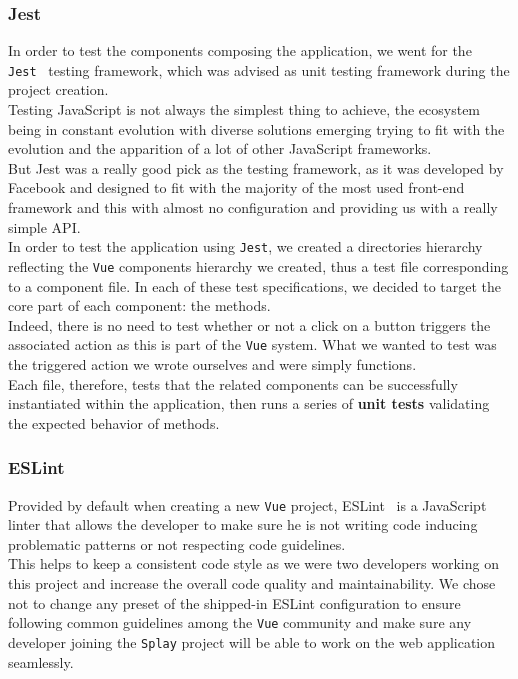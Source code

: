 \documentclass{eplmastersthesis}
\begin{document}
        \subsubsection{Jest}

          In order to test the components composing the application, we
          went for the \texttt{Jest}~\cite{jest} testing framework, which was advised
          as unit testing framework during the project creation.\\

          Testing JavaScript is not always the simplest thing to achieve, the
          ecosystem being in constant evolution with diverse solutions emerging
          trying to fit with the evolution and the apparition of a lot of
          other JavaScript frameworks.\\
          But Jest was a really good pick as the testing framework, as it was
          developed by Facebook and designed to fit with the majority of the
          most used front-end framework and this with almost no configuration and
          providing us with a really simple API.\\

          In order to test the application using \texttt{Jest}, we created a directories
          hierarchy reflecting the \texttt{Vue} components hierarchy we created, thus
          a test file corresponding to a component file. In each of these
          test specifications, we decided to target the core part of each
          component: the methods.\\
          Indeed, there is no need to test whether or not a click on a button
          triggers the associated action as this is part of the \texttt{Vue} system. What
          we wanted to test was the triggered action we wrote ourselves and
          were simply functions.\\
          Each file, therefore, tests that the related components can be
          successfully instantiated within the application, then runs a series
          of \textbf{unit tests} validating the expected behavior of methods.

        \subsubsection{ESLint}

          Provided by default when creating a new \texttt{Vue} project, ESLint~\cite{eslint}
          is a JavaScript linter that allows the developer to
          make sure he is not writing code inducing problematic patterns or not
          respecting code guidelines.\\
          This helps to keep a consistent code style as we were two developers working
          on this project and increase the overall code quality and
          maintainability. We chose not to change any preset of the shipped-in
          ESLint configuration to ensure following common guidelines among the \texttt{Vue}
          community and make sure any developer joining the \texttt{Splay} project will
          be able to work on the web application seamlessly.
\end{document}
